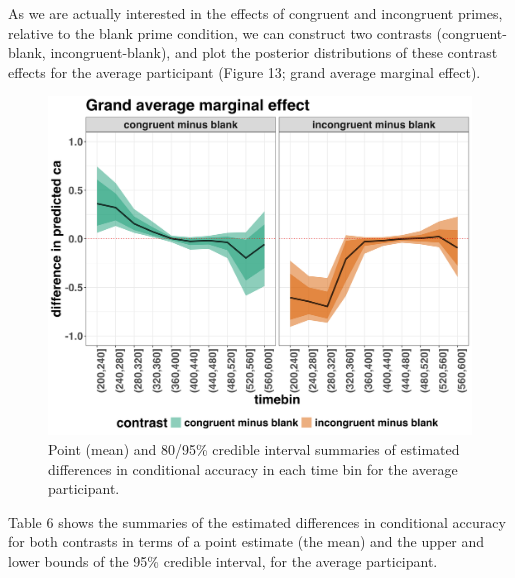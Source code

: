 \documentclass[
  man, donotrepeattitle,floatsintext]{apa6}
\begin{document}
As we are actually interested in the effects of congruent and incongruent primes, relative to the blank prime condition, we can construct two contrasts (congruent-blank, incongruent-blank), and plot the posterior distributions of these contrast effects for the average participant (Figure 13; grand average marginal effect).



\begin{figure}[H]

{\centering \includegraphics[width=0.8\linewidth,height=0.67\textheight,]{../Tutorial_2_Bayesian/figures/M1i_ca_grand_AME} 

}

\caption{Point (mean) and 80/95\% credible interval summaries of estimated differences in conditional accuracy in each time bin for the average participant.}\label{fig:plot-ca-grand-ame-effects}
\end{figure}

Table 6 shows the summaries of the estimated differences in conditional accuracy for both contrasts in terms of a point estimate (the mean) and the upper and lower bounds of the 95\% credible interval, for the average participant.
\end{document}
